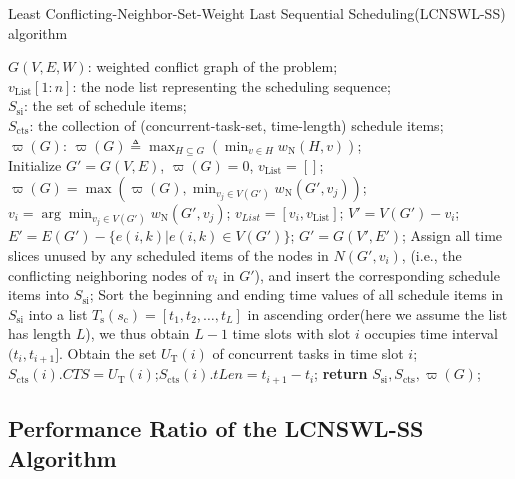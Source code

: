 \documentclass[journal,10pt]{IEEEtran}
\begin{document}
\begin{algorithm}[!htb]
\caption{Least Conflicting-Neighbor-Set-Weight Last Sequential Scheduling(LCNSWL-SS) algorithm}
\begin{algorithmic}[1]\label{Alg_LNSWL_SS}
    \REQUIRE $G(V,E,W)$: weighted conflict graph of the problem;\\
    \ENSURE $v_\text{List}[1{:}n]$: the node list representing the scheduling sequence;\\
    $S_\text{si}$: the set of schedule items;\\
    $S_\text{cts}$: the collection of (concurrent-task-set, time-length) schedule items;\\
    $\varpi(G)$: $\varpi(G){\triangleq}\max_{H{\subseteq}G}(\min_{v{\in}H}w_\text{N}(H,v))$; \\
    \STATE Initialize $G'{=}G(V,E)$, $\varpi(G){=}0$, $v_\text{List}{=}[]$;
    \label{seqbegin}
        \STATE $\varpi(G){=}\max(\varpi(G),\min_{v_j{\in}V(G')}w_\text{N}(G',v_j))$;\label{v_update}
        \STATE $v_i{=}\arg\min_{v_j{\in}V(G')}w_\text{N}(G',v_j)$; $v_{List}=[v_i,v_\text{List}]$;
        \STATE $V'{=}V(G'){-}v_i$; $E'{=}E(G'){-}\{e(i,k)|e(i,k){\in}V(G')\}$;
        \STATE $G'{=}G(V',E')$;
    \ENDWHILE \label{seqend}
     \label{schbegin}
        \STATE Assign all time slices unused by any scheduled items of the nodes in $N(G',v_i)$, (i.e., the conflicting neighboring nodes of $v_i$ in $G'$), and insert the corresponding schedule items into $S_\text{si}$;
    \ENDFOR \label{schend}
    \STATE Sort the beginning and ending time values of all schedule items in $S_\text{si}$ into a list $T_\text{s}(s_\text{c}){=}[t_1,t_2,\ldots,t_{L}]$ in ascending order(here we assume the list has length $L$), we thus obtain $L{-}1$ time slots with slot $i$ occupies time interval $(t_{i},t_{i{+}1}]$.\label{ctsbegin}
        \STATE Obtain the set $U_\text{T}(i)$ of concurrent tasks in time slot $i$;
        \STATE $S_\text{cts}(i).CTS{=}U_\text{T}(i)$;$S_\text{cts}(i).tLen{=}t_{i{+}1}{-}t_{i}$;
    \ENDFOR \label{ctsend}
    \STATE \textbf{return} $S_\text{si}, S_\text{cts}, \varpi(G)$;
\end{algorithmic}
\end{algorithm}

\subsection{Performance Ratio of the LCNSWL-SS Algorithm}
\end{document}
